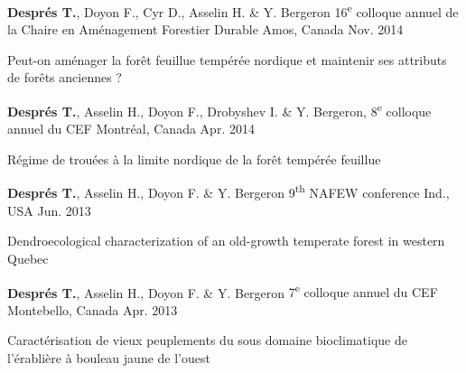 \begin{cventries}
  \cventry
    {\textbf{Després T.}, Doyon F., Cyr D., Asselin H. \& Y. Bergeron}
    {16\textsuperscript{e} colloque annuel de la Chaire en Aménagement Forestier Durable}
    {Amos, Canada}
    {Nov. 2014}
    {
      \begin{cvitems}
        \item []{Peut-on aménager la forêt feuillue tempérée nordique et maintenir ses attributs de forêts anciennes ?}
      \end{cvitems}
    }
    \cventry
    {\textbf{Després T.}, Asselin H., Doyon F., Drobyshev I. \& Y. Bergeron,}
    {8\textsuperscript{e} colloque annuel du CEF}
    {Montréal, Canada}
    {Apr. 2014}
    {
      \begin{cvitems}
        \item []{Régime de trouées à la limite nordique de la forêt tempérée feuillue}
      \end{cvitems}
    }
    \cventry
    {\textbf{Després T.}, Asselin H., Doyon F. \& Y. Bergeron}
    {9\textsuperscript{th} NAFEW conference}
    {Ind., USA}
    {Jun. 2013}
    {
      \begin{cvitems}
        \item []{Dendroecological characterization of an old-growth temperate forest in western Quebec}
      \end{cvitems}
    }
    \cventry
    {\textbf{Després T.}, Asselin H., Doyon F. \& Y. Bergeron}
    {7\textsuperscript{e} colloque annuel du CEF}
    {Montebello, Canada}
    {Apr. 2013}
    {
      \begin{cvitems}
        \item []{Caractérisation de vieux peuplements du sous domaine bioclimatique de l'érablière à bouleau jaune de l'ouest}
      \end{cvitems}
    }
\end{cventries}

